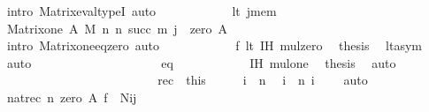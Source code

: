 \begin{isabellebody}
\ {\isacharparenleft}{\kern0pt}intro\ Matrix{\isacharunderscore}{\kern0pt}eval{\isacharunderscore}{\kern0pt}typeI{\isacharparenright}{\kern0pt}\ auto\isanewline
\ \ \ \ \ \ \ \ \ \ \isamarkupfalse%
\ lt\ j{\isacharunderscore}{\kern0pt}mem\ \isamarkupfalse%
\ {\isachardoublequoteopen}Matrix{\isacharunderscore}{\kern0pt}one\ A\ M\ n\ n\ {\isacharbackquote}{\kern0pt}{\isacharparenleft}{\kern0pt}succ\ m{\isacharparenright}{\kern0pt}\ {\isacharbackquote}{\kern0pt}j\ {\isacharequal}{\kern0pt}\ zero\ A{\isachardoublequoteclose}\isanewline
\ \ \ \ \ \ \ \ \ \ \ \ \isamarkupfalse%
\ {\isacharparenleft}{\kern0pt}intro\ Matrix{\isacharunderscore}{\kern0pt}one{\isacharunderscore}{\kern0pt}eq{\isacharunderscore}{\kern0pt}zero{\isacharparenright}{\kern0pt}\ auto\isanewline
\ \ \ \ \ \ \ \ \ \ \isamarkupfalse%
\ f\ lt\ IH\ mul{\isacharunderscore}{\kern0pt}zero\ \isamarkupfalse%
\ {\isacharquery}{\kern0pt}thesis\ \isamarkupfalse%
\ lt{\isacharunderscore}{\kern0pt}asym\ \isamarkupfalse%
\ auto\isanewline
\ \ \ \ \ \ \ \ \isamarkupfalse%
\isanewline
\ \ \ \ \ \ \ \ \ \ \isamarkupfalse%
\ eq\isanewline
\ \ \ \ \ \ \ \ \ \ \isamarkupfalse%
\ IH\ mul{\isacharunderscore}{\kern0pt}one\ \isamarkupfalse%
\ {\isacharquery}{\kern0pt}thesis\ \isamarkupfalse%
\ auto\isanewline
\ \ \ \ \ \ \ \ \isamarkupfalse%
\isanewline
\ \ \ \ \ \ \isamarkupfalse%
\isanewline
\ \ \ \ \isamarkupfalse%
\isanewline
\ \ \isacommand{{\isacharbraceright}{\kern0pt}}\isamarkupfalse%
\ \isamarkupfalse%
\ rec\ {\isacharequal}{\kern0pt}\ this\isanewline
\ \ \isamarkupfalse%
\ \isamarkupfalse%
\ {\isacartoucheopen}i\ {\isasymin}\ {\isacharbrackleft}{\kern0pt}{}{\isacharcomma}{\kern0pt}{\isasymdots}{\isacharcomma}{\kern0pt}n{\isacharbrackleft}{\kern0pt}{\isacartoucheclose}\ \isamarkupfalse%
\ {\isachardoublequoteopen}i\ {\isacharless}{\kern0pt}\ n{\isachardoublequoteclose}\ {\isachardoublequoteopen}i\ {\isasymin}\ {\isasymnat}{\isachardoublequoteclose}\ \isamarkupfalse%
\ auto\isanewline
\ \ \isanewline
\ \ \isamarkupfalse%
\ \isamarkupfalse%
\ {\isachardoublequoteopen}nat{\isacharunderscore}{\kern0pt}rec{\isacharprime}{\kern0pt}\ n\ {\isacharparenleft}{\kern0pt}zero\ A{\isacharparenright}{\kern0pt}\ {\isacharquery}{\kern0pt}f\ {\isacharequal}{\kern0pt}\ N{\isacharbackquote}{\kern0pt}i{\isacharbackquote}{\kern0pt}j{\isachardoublequoteclose}\isanewline

\end{isabellebody}
